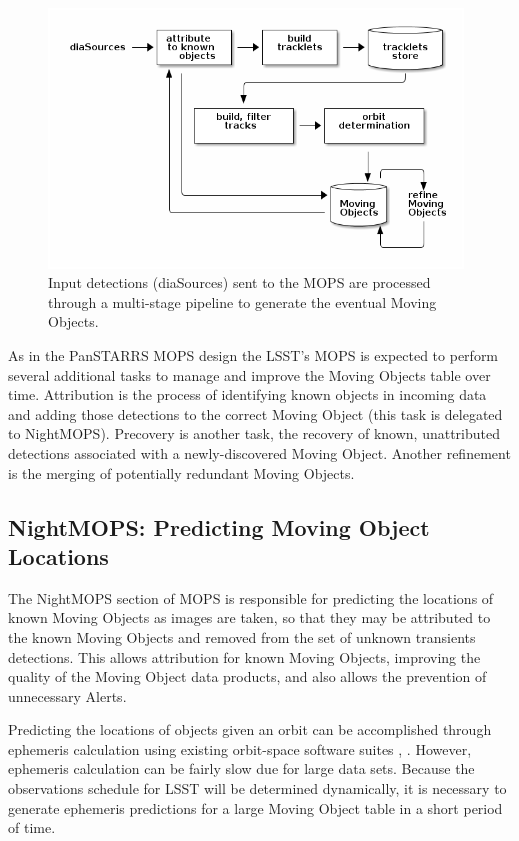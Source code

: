 \documentclass[12pt,preprint]{aastex}
\begin{document}
\begin{figure}[h]
\begin{center}
  \includegraphics[width=11cm]{illustrations/mopsDiagram.png}
\end{center}
\caption{ Input detections (diaSources) sent to the MOPS are processed
  through a multi-stage pipeline to generate the eventual Moving
  Objects.} 
\end{figure}


As in the PanSTARRS MOPS design \citep{psMOPSDesign} the LSST's MOPS
is expected to perform several additional tasks to manage and improve
the Moving Objects table over time.  Attribution is the process of
identifying known objects in incoming data and adding those detections
to the correct Moving Object (this task is delegated to
NightMOPS). Precovery is another task, the recovery of known,
unattributed detections associated with a newly-discovered Moving
Object.  Another refinement is the merging of potentially redundant
Moving Objects.


\subsection{NightMOPS: Predicting Moving Object Locations}

The NightMOPS section of MOPS is responsible for predicting the
locations of known Moving Objects as images are taken, so that they
may be attributed to the known Moving Objects and removed from the set
of unknown transients detections.  This allows attribution for known
Moving Objects, improving the quality of the Moving Object data
products, and also allows the prevention of unnecessary Alerts.

Predicting the locations of objects given an orbit can be accomplished
through ephemeris calculation using existing orbit-space software
suites \citep{Milani2006}, \citep{OpenOrb2009}.  However, ephemeris
calculation can be fairly slow due for large data sets.  Because the
observations schedule for LSST will be determined dynamically, it is
necessary to generate ephemeris predictions for a large Moving Object
table in a short period of time.
\end{document}
